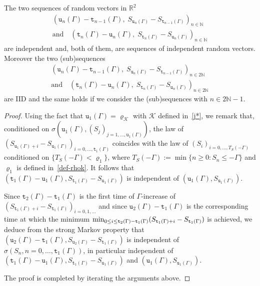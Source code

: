 \documentclass[AHL,Unicode,longabstracts,published]{cedram}
\newcommand{\bbN}{\mathbb{N}}
\newcommand{\bbR}{\mathbb{R}}
\renewcommand*\ss{\mathtt{u}}
\newcommand{\ttt}{\mathtt{t}}
\newcommand{\clK}{\mathcal{K}}
\begin{document}
\begin{lemm}\label{th:ren-u}
The two sequences of random vectors in $\bbR^2$
\begin{multline}
\left(\ss_n(\Gamma)- \ttt_{n-1}(\Gamma), \;S_{\ss_n(\Gamma)}- S_{\ttt_{n-1}(\Gamma)}\right)_{n\in \bbN}\\
\text{and}\quad
\left(\ttt_n(\Gamma)- \ss_n(\Gamma), \;S_{\ttt_n(\Gamma)}- S_{\ss_n(\Gamma)}\right)_{n\in \bbN}
\end{multline}
are independent and, both of them, are sequences of independent random vectors. Moreover the two (sub)sequences
\begin{multline}
\left(\ss_n(\Gamma)- \ttt_{n-1}(\Gamma), \;S_{\ss_n(\Gamma)}- S_{\ttt_{n-1}(\Gamma)}\right)_{n\in 2\bbN}\\
\text{and}\quad
\left(\ttt_n(\Gamma)- \ss_n(\Gamma), \;S_{\ttt_n(\Gamma)}- S_{\ss_n(\Gamma)}\right)_{n\in 2\bbN}
\end{multline}
are IID and the same holds if we consider the (sub)sequences with $n \in 2\bbN-1$.
\end{lemm}

\begin{proof}
Using the fact that $\ss_1(\Gamma)=\varrho_{\clK}$ with ${\clK}$ defined in~\eqref{j*}, we remark that, conditioned on $\sigma(\ss_1(\Gamma), (S_j)_{j=1,
\dots,\ss_1(\Gamma)})$, the law of $(S_{\ss_1(\Gamma)+i}-S_{\ss_1(\Gamma)})_{i=0, \dots, \ttt_1(\Gamma)}$ coincides with the law of $(S_i)_{i=0, \dots, T_S(-\Gamma)}$ conditioned on $\{T_S(-\Gamma)< \varrho_1\}$, where $T_S(-\Gamma):= \min\{n\ge 0: S_n \le -\Gamma\}$ and $\varrho_1$ is defined in~\eqref{def-rhok}. It follows that $(\ttt_1(\Gamma)-\ss_1(\Gamma), S_{\ttt_1(\Gamma)}- S_{\ss_1(\Gamma)})$ is independent of $(\ss_1(\Gamma), S_{\ss_1(\Gamma)})$.

Since $\ttt_2(\Gamma)-\ttt_1(\Gamma)$ is the first time of $\Gamma$-increase of $(S_{\ttt_1(\Gamma)+i}- S_{\ttt_1(\Gamma)})_{i=0, 1, \dots}$ and since $\ss_2(\Gamma)-\ttt_1(\Gamma)$ is the corresponding time at which the minimum $\min_{0\le i \le \ttt_2(\Gamma)-\ttt_1(\Gamma)}\linebreak(S_{\ttt_1(\Gamma)+i}- S_{\ttt_1(\Gamma)})$ is achieved, we deduce from the strong Markov property that $(\ss_2(\Gamma)-\ttt_1(\Gamma), S_{\ss_2(\Gamma)}- S_{\ttt_1(\Gamma)})$ is independent of $\sigma(S_n, n=0, \dots, \ttt_1(\Gamma))$, in particular independent of $(\ttt_1(\Gamma)-\ss_1(\Gamma), S_{\ttt_1(\Gamma)}- S_{\ss_1(\Gamma)})$ and $(\ss_1(\Gamma), S_{\ss_1(\Gamma)})$.

The proof is completed by iterating the arguments above.
\end{proof}
\end{document}
